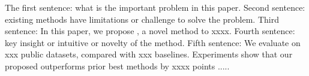 The first sentence: what is the important problem in this paper. 
Second sentence: existing methods have limitations or challenge to solve the problem. 
Third sentence: In this paper, we propose \method, a novel method to xxxx. 
Fourth sentence: key insight or intuitive or novelty of the method. 
Fifth sentence: We evaluate \method on xxx public datasets, compared with xxx baselines. 
Experiments show that our proposed \method outperforms prior best methods by xxxx points ..... 
